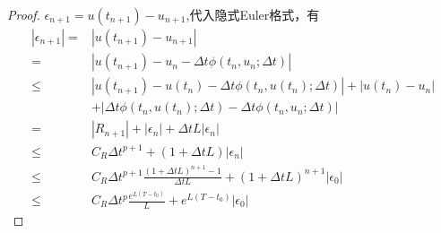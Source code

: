 \documentclass{article}%
\begin{document}
\begin{proof}
	$ \epsilon _{n+1}=u(t_{n+1})-u_{n+1} $,代入隐式Euler格式，有
	\begin{align*}
	\left |\epsilon _{n+1}  \right | = &  \left| u\left (t_{n+1}  \right ) - u_{n+1} \right| \\
	= & \left| u\left (t_{n+1}  \right ) - u_n - \Delta t \phi \left ( t_{n},u_{n};\Delta t \right )  \right| \\
	\leq & \left| u\left (t_{n+1}  \right ) - u \left (t_n   \right )- \Delta t \phi \left ( t_{n},u \left (t_n   \right );\Delta t \right ) \right| + \left| u\left (t_{n}  \right ) - u_n  \right| \\
	& + \left| \Delta t \phi \left ( t_{n},u\left (t_n   \right );\Delta t \right ) - \Delta t \phi \left ( t_{n},u_{n};\Delta t \right ) \right| \\
	= & \left | R_{n+1} \right | +\left | \epsilon _{n} \right | + \Delta t L \left | \epsilon _{n} \right | \\
	\leq & C_{R}\Delta t^{p+1}  + \left (1+\Delta t L  \right ) \left | \epsilon _{n} \right | \\
	\leq &  C_{R}\Delta t^{p+1} \frac{\left ( 1+\Delta tL \right )^{n+1} - 1}{ \Delta t L}+\left ( 1+\Delta tL \right )^{n+1}\left |\epsilon _{0} \right | \\
	\leq & C_{R}\Delta t^{p} \frac{e^{L\left (T-t_{0}  \right )} }{  L}+e^{L\left (T-t_{0}  \right )}\left |\epsilon _{0}  \right |	
	\end{align*}
\end{proof}
\end{document}
